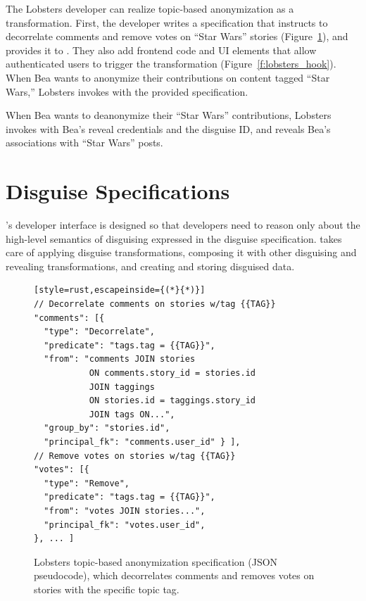 %
The Lobsters developer can realize topic-based anonymization as a \xxing
transformation.
%
First, the developer writes a \xx specification that instructs \sys to
decorrelate comments and remove votes on ``Star Wars'' stories
(Figure~\ref{f:spec}), and provides it to \sys.
%
They also add frontend code and UI elements that allow authenticated users to
trigger the \xxing transformation (Figure~\ref{f:lobsters_hook}).
%
When Bea wants to anonymize their contributions on content tagged ``Star Wars,''
Lobsters invokes \sys with the provided specification.

%
When Bea wants to deanonymize their ``Star Wars'' contributions, Lobsters
invokes \sys with Bea's reveal credentials and the disguise ID, and \sys reveals
Bea's associations with ``Star Wars'' posts.
%


\section{Disguise Specifications}
\label{s:spec}

\sys's developer interface is designed so that developers need to reason only
about the high-level semantics of disguising expressed in the disguise
specification. \sys takes care of applying disguise transformations, composing
it with other disguising and revealing transformations, and creating and storing
disguised data.


\begin{figure}[t]
\centering
\begin{lstlisting}[style=rust,escapeinside={(*}{*)}]
// Decorrelate comments on stories w/tag {{TAG}}
"comments": [{
  "type": "Decorrelate",
  "predicate": "tags.tag = {{TAG}}",
  "from": "comments JOIN stories
           ON comments.story_id = stories.id
           JOIN taggings
           ON stories.id = taggings.story_id
           JOIN tags ON...",
  "group_by": "stories.id",
  "principal_fk": "comments.user_id" } ],
// Remove votes on stories w/tag {{TAG}}
"votes": [{
  "type": "Remove",
  "predicate": "tags.tag = {{TAG}}",
  "from": "votes JOIN stories...",
  "principal_fk": "votes.user_id",
}, ... ]
\end{lstlisting}
    \caption{Lobsters topic-based anonymization \xx specification (JSON
    pseudocode), which decorrelates comments and removes votes on stories with
    the specific topic tag.}
\label{f:spec}
\end{figure}

